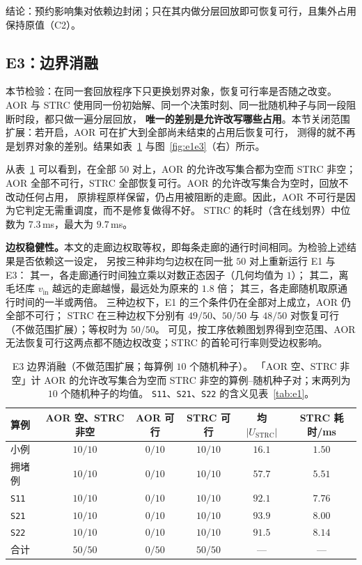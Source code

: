 \documentclass[manuscript,screen,review]{acmart}
\providecommand{\STRC}{\textsc{STRC}}
\newcommand{\NSeeds}{10}
\newcommand{\NPairs}{50}
\newcommand{\FeasRone}{0/\NPairs}            %
\newcommand{\FeasRtwo}{\NPairs/\NPairs}  %
\newcommand{\MsRepairMed}{7.3}
\newcommand{\MsRepairMax}{9.7}
\newcommand{\WeightLogRtwo}{49/\NPairs}
\newcommand{\WeightLuRtwo}{\NPairs/\NPairs}
\newcommand{\WeightSplitRtwo}{48/\NPairs}
\begin{document}
结论：预约影响集对依赖边封闭；只在其内做分层回放即可恢复可行，且集外占用保持原值（C2）。

\subsection{E3：边界消融}
\label{sec:e3}

本节检验：在同一套回放程序下只更换划界对象，恢复可行率是否随之改变。
AOR 与 \STRC{} 使用同一份初始解、同一个决策时刻、同一批随机种子与同一段阻断时段，都只做一遍分层回放，
\textbf{唯一的差别是允许改写哪些占用}。本节关闭范围扩展：若开启，AOR 可在扩大到全部尚未结束的占用后恢复可行，
测得的就不再是划界对象的差别。结果如表~\ref{tab:e3} 与图~\ref{fig:e1e3}（右）所示。

从表~\ref{tab:e3} 可以看到，在全部 \(\NPairs\) 对上，AOR 的允许改写集合都为空而 \STRC{} 非空；
AOR 全部不可行，\STRC{} 全部恢复可行。AOR 的允许改写集合为空时，回放不改动任何占用，
原排程原样保留，仍占用被阻断的走廊。因此，AOR 不可行是因为它判定无需重调度，而不是修复做得不好。
\STRC{} 的耗时（含在线划界）中位数为 \(\MsRepairMed\)\,ms，最大为 \(\MsRepairMax\)\,ms。

\textbf{边权稳健性。}本文的走廊边权取等权，即每条走廊的通行时间相同。为检验上述结果是否依赖这一设定，
另按三种非均匀边权在同一批 \(\NPairs\) 对上重新运行 E1 与 E3：
其一，各走廊通行时间独立乘以对数正态因子（几何均值为 \(1\)）；
其二，离毛坯库 \(v_{\mathrm{in}}\) 越远的走廊越慢，最远处为原来的 \(1.8\) 倍；
其三，各走廊随机取原通行时间的一半或两倍。
三种边权下，E1 的三个条件仍在全部对上成立，AOR 仍全部不可行；
\STRC{} 在三种边权下分别有 \(\WeightLogRtwo\)、\(\WeightLuRtwo\) 与 \(\WeightSplitRtwo\) 对恢复可行（不做范围扩展）；等权时为 \(\FeasRtwo\)。
可见，按工序依赖图划界得到空范围、AOR 无法恢复可行这两点都不随边权改变；\STRC{} 的首轮可行率则受边权影响。

\begin{table}[t]
\centering
\caption{E3 边界消融（不做范围扩展；每算例 \(\NSeeds\) 个随机种子）。
「AOR 空、\STRC{} 非空」计 AOR 的允许改写集合为空而 \STRC{} 非空的算例--随机种子对；末两列为 \(\NSeeds\) 个随机种子的均值。
\texttt{S11}、\texttt{S21}、\texttt{S22} 的含义见表~\ref{tab:e1}。}
\label{tab:e3}
\small
\begin{tabular}{@{}lccccc@{}}
\toprule
算例 & AOR 空、\STRC{} 非空 & AOR 可行 & \STRC{} 可行 & 均 \(|U_{\mathrm{STRC}}|\) & \STRC{} 耗时/ms \\
\midrule
小例   & \(10/10\) & \(0/10\) & \(10/10\) & \(16.1\) & \(1.50\) \\
拥堵例 & \(10/10\) & \(0/10\) & \(10/10\) & \(57.7\) & \(5.51\) \\
\texttt{S11}  & \(10/10\) & \(0/10\) & \(10/10\) & \(92.1\) & \(7.76\) \\
\texttt{S21}    & \(10/10\) & \(0/10\) & \(10/10\) & \(93.9\) & \(8.00\) \\
\texttt{S22}     & \(10/10\) & \(0/10\) & \(10/10\) & \(91.5\) & \(8.14\) \\
\midrule
合计 & \(\NPairs/\NPairs\) & \(\FeasRone\) & \(\FeasRtwo\) & --- & --- \\
\bottomrule
\end{tabular}
\end{table}
\end{document}
